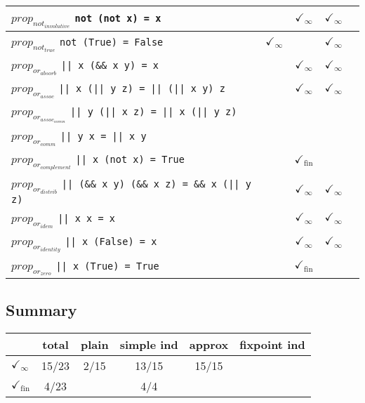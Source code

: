 \documentclass{article}
\begin{document}
\begin{longtable}{p{10cm} || c | c | c | c | }
\hline
$prop_{not_{involutive}}$ \newline \verb`not (not x) = x` &  & $\checkmark_{\infty}$ & $\checkmark_{\infty}$ &  \\
\hline
$prop_{not_{true}}$ \newline \verb`not (True) = False` & $\checkmark_{\infty}$ &  & $\checkmark_{\infty}$ &  \\
\hline
$prop_{or_{absorb}}$ \newline \verb`|| x (&& x y) = x` &  & $\checkmark_{\infty}$ & $\checkmark_{\infty}$ &  \\
\hline
$prop_{or_{assoc}}$ \newline \verb`|| x (|| y z) = || (|| x y) z` &  & $\checkmark_{\infty}$ & $\checkmark_{\infty}$ &  \\
\hline
$prop_{or_{assoc_{comm}}}$ \newline \verb`|| y (|| x z) = || x (|| y z)` &  &  &  &  \\
\hline
$prop_{or_{comm}}$ \newline \verb`|| y x = || x y` &  &  &  &  \\
\hline
$prop_{or_{complement}}$ \newline \verb`|| x (not x) = True` &  & $\checkmark_{\mathrm{fin}}$ &  &  \\
\hline
$prop_{or_{distrib}}$ \newline \verb`|| (&& x y) (&& x z) = && x (|| y z)` &  & $\checkmark_{\infty}$ & $\checkmark_{\infty}$ &  \\
\hline
$prop_{or_{idem}}$ \newline \verb`|| x x = x` &  & $\checkmark_{\infty}$ & $\checkmark_{\infty}$ &  \\
\hline
$prop_{or_{identity}}$ \newline \verb`|| x (False) = x` &  & $\checkmark_{\infty}$ & $\checkmark_{\infty}$ &  \\
\hline
$prop_{or_{zero}}$ \newline \verb`|| x (True) = True` &  & $\checkmark_{\mathrm{fin}}$ &  &  \\
\end{longtable}

\subsection*{Summary}
\begin{longtable}{p{4cm} || c | c | c | c | c | }
  & total & plain & simple ind & approx & fixpoint ind \\
\hline
$\checkmark_{\infty}$ & 15/23 & 2/15 & 13/15 & 15/15 & \\
\hline
$\checkmark_{\mathrm{fin}}$ & 4/23 &  & 4/4 &  & \\
\end{longtable}
\end{document}
